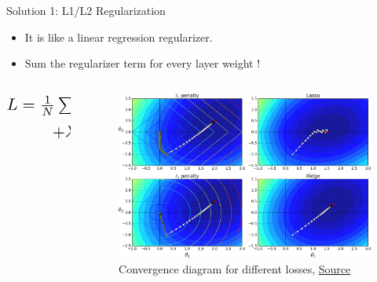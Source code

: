 \documentclass[compress,oilve,t]{beamer}
\newcommand{\tc}[2]{
	\textcolor{#1}{\hspace{-2pt}#2\hspace{-2pt}}
}
\begin{document}
\begin{frame}{Solution 1: L1/L2 Regularization}
	\begin{itemize}
		\item It is like a linear regression regularizer.
		\item Sum the regularizer term for every \tc{keywords}{layer weight}!
	\end{itemize}
	\begin{columns}
		\begin{column}[c]{0.5\textwidth}
			\begin{align*}
				\scalebox{1.5}{$L = \frac{1}{N} \sum_{i=1}^{N} L(\phi(x_i), y_i)$} \\
				\scalebox{1.5}{$+ \lambda \sum_{i,j,k} R(W_{j,k}^{(i)})$}
			\end{align*}
		\end{column}
		\begin{column}[c]{0.5\textwidth}
			\begin{figure}[H]
				\centering
				\includegraphics[width=\textwidth]{Figs/section_4/overfitting_loss.png}
				\caption{Convergence diagram for different losses, \href{https://www.oreilly.com/library/view/hands-on-machine-learning/9781491962282/ch04.html}{Source}}
			\end{figure}
		\end{column}
	\end{columns}
\end{frame}
\end{document}
